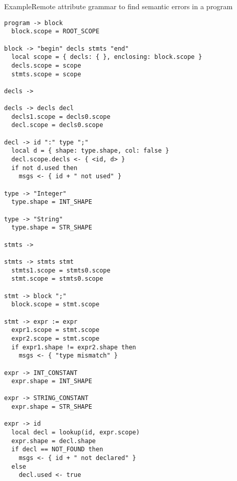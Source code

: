 \begin{frame}[fragile=singleslide]{Example}{Remote attribute grammar to find semantic errors in a program}

\begin{centering}
\begin{multicols}{2}
\begin{Verbatim}[fontsize=\fontsize{5.5}{6}\selectfont]
program -> block
  block.scope = ROOT_SCOPE

block -> "begin" decls stmts "end"
  local scope = { decls: { }, enclosing: block.scope }
  decls.scope = scope
  stmts.scope = scope

decls ->

decls -> decls decl
  decls1.scope = decls0.scope
  decl.scope = decls0.scope

decl -> id ":" type ";"
  local d = { shape: type.shape, col: false } 
  decl.scope.decls <- { <id, d> }
  if not d.used then
    msgs <- { id + " not used" }

type -> "Integer"
  type.shape = INT_SHAPE

type -> "String"
  type.shape = STR_SHAPE

stmts -> 

stmts -> stmts stmt
  stmts1.scope = stmts0.scope
  stmt.scope = stmts0.scope

stmt -> block ";"
  block.scope = stmt.scope

stmt -> expr := expr
  expr1.scope = stmt.scope
  expr2.scope = stmt.scope
  if expr1.shape != expr2.shape then
    msgs <- { "type mismatch" }

expr -> INT_CONSTANT
  expr.shape = INT_SHAPE

expr -> STRING_CONSTANT
  expr.shape = STR_SHAPE

expr -> id
  local decl = lookup(id, expr.scope)
  expr.shape = decl.shape
  if decl == NOT_FOUND then
    msgs <- { id + " not declared" }
  else
    decl.used <- true
\end{Verbatim}
\end{multicols}
\end{centering}

\end{frame}








